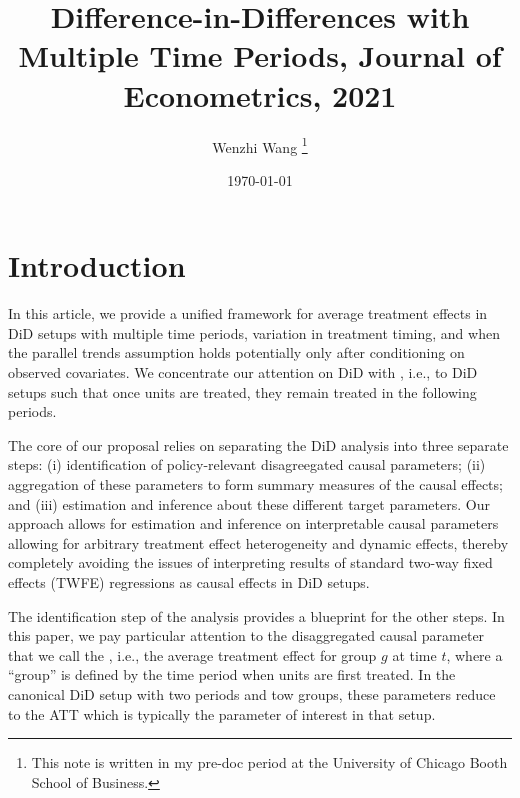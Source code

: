 \documentclass[12pt]{article}
\newcommand{\highlightB}[1]{{\emph{\color{MyBlue}{#1}}}}
\newcommand{\highlightP}[1]{{\emph{\color{MyPink}{#1}}}}
\theoremstyle{definition}
\begin{document}

\title{\bf Difference-in-Differences with Multiple Time Periods, Journal of Econometrics, 2021}
\author{Wenzhi Wang \thanks{This note is written in my pre-doc period at the University of Chicago Booth School of Business.} } 
\date{\today}
\maketitle

\citet{callawayDifferenceinDifferencesMultipleTime2021}

\section{Introduction}

In this article, we provide a unified framework for average treatment effects in DiD setups with multiple time periods, variation in treatment timing, and when the parallel trends assumption holds potentially only after conditioning on observed covariates. We concentrate our attention on DiD with \highlightP{staggered adoption}, i.e., to DiD setups such that once units are treated, they remain treated in the following periods. 

The core of our proposal relies on separating the DiD analysis into three separate steps: (i) identification of policy-relevant disagreegated causal parameters; (ii) aggregation of these parameters to form summary measures of the causal effects; and (iii) estimation and inference about these different target parameters. Our approach allows for estimation and inference on interpretable causal parameters allowing for arbitrary treatment effect heterogeneity and dynamic effects, thereby completely avoiding the issues of interpreting results of standard two-way fixed effects (TWFE) regressions as causal effects in DiD setups.

The identification step of the analysis provides a blueprint for the other steps. In this paper, we pay particular attention to the disaggregated causal parameter that we call the \highlightB{group-time average treatment effect}, i.e., the average treatment effect for group $g$ at time $t$, where a ``group'' is defined by the time period when units are first treated. In the canonical DiD setup with two periods and tow groups, these parameters reduce to the ATT which is typically the parameter of interest in that setup. \highlightP{An attractive feature of the group-time average treatment effect parameters is that they do not directly restrict heterogeneity with respect to observed covariates, the period in which units are first treated, or the evolution of treatment effect heterogeneity, and/or to construct many other more aggregated causal parameters.}
\end{document}
